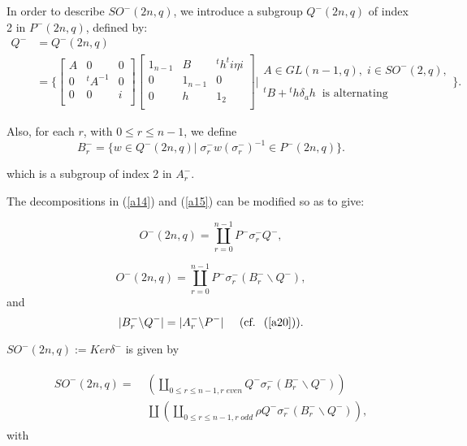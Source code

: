 \documentclass[a4,12pt]{elsart}
\begin{document}
In order to describe $SO^-(2n,q)$, we introduce a subgroup $Q^-
(2n,q)$ of index 2 in $P^- (2n,q)$, defined by:
\begin{align*}
Q^{-}&=Q^{-}(2n,q)\\
     &
=\bigg\{\left[\begin{smallmatrix}
  A & 0 & 0 \\
  0 & {}^{t}A^{-1} & 0 \\
  0 & 0 &i \\
\end{smallmatrix}\right]
\left[\begin{smallmatrix}
  1_{n-1} & B       & {}^{t}h^{t}i \eta i \\
  0       & 1_{n-1} & 0 \\
  0       & h       & 1_{2} \\
\end{smallmatrix}\right] \big| \substack{A \in GL(n-1,q), \; i \in SO^{-}(2,q),\\
 \\
          {}^{t}B+{}^{t}h \delta_{a}h \;\; \textrm{is
          alternating}}\bigg\}.
\end{align*}

Also, for each $r$, with $0 \leq r \leq n-1$, we define
\begin{equation*}
B_r^-=\{w \in Q^-(2n,q)| \; \sigma_r^- w(\sigma_r^-)^{-1} \in P^-
(2n,q)\}.
\end{equation*}

which is a subgroup of index 2 in $ A_{r}^{-}$.

The decompositions in (\ref{a14}) and (\ref{a15}) can be modified so
as to give:

\begin{equation*}
O^{-}(2n,q)=\coprod_{r=0}^{n-1}P^- \sigma_r^{-}Q^{-},
\end{equation*}

\begin{equation}\label{a23}
 O^{-}(2n,q)=\coprod_{r=0}^{n-1}P^- \sigma_r^{-}(B_r^-  \backslash Q^-),
\end{equation}
and
\begin{equation*}
|B_r^- \backslash Q^-|=|A_r^{-} \backslash P^-|       \;\;\;\;\;
\textrm{(cf. \;(\ref{a20}))}.
\end{equation*}

$SO^{-}(2n,q):=Ker\delta^{-}$ is given by

\begin{align}\label{a24}
\begin{split}
 SO^{-}(2n,q)= \; &(\coprod_{0 \leq r \leq n-1,r \; even} Q^- \sigma_r^{-}( B_r^- \backslash Q^-))\\
                  &\coprod(\coprod_{0 \leq r \leq n-1, r \; odd} \rho Q^- \sigma_r^{-}( B_r^- \backslash Q^-
                  )),
\end{split}
\end{align}
with
\end{document}
